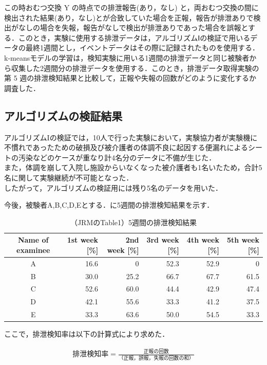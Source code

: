 この時おむつ交換 Y の時点での排泄報告(あり，なし) と，両おむつ交換の間に検出された結果(あり，なし)とが合致していた場合を正報，報告が排泄ありで検出がなしの場合を失報，報告がなしで検出が排泄ありであった場合を誤報とする．このとき，実験に使用する排泄データは，アルゴリズムⅠの検証で用いるデータの最終1週間とし，イベントデータはその際に記録されたものを使用する．k-meansモデルの学習は，検知実験に用いる1週間の排泄データと同じ被験者から収集した2週間分の排泄データを使用する．このとき，排泄データ取得実験の第 5 週の排泄検知結果と比較して，正報や失報の回数がどのように変化するか調査した．

\subsection{アルゴリズムの検証結果}\label{chap:3.3.4}
アルゴリズムIの検証では，10人で行った実験において，実験協力者が実験機に不慣れであったための破損及び被介護者の体調不良に起因する便漏れによるシートの汚染などのケースが重なり計4名分のデータに不備が生じた．\\
また，体調を崩して入院し施設からいなくなった被介護者も1名いたため，合計5名に関して実験継続が不可能となった．\\
したがって，アルゴリズムの検証用には残り5名のデータを用いた．

今後，被験者A,B,C,D,Eとする．に5週間の排泄検知結果を示す．

\begin{table}[t]
\begin{center}
\caption{（JRMのTable1）5週間の排泄検知結果}
\begin{tabular}[t]{c|r|r|r|r|r}
\hline
Name of examinee & 1st week [\%] & 2nd week [\%] & 3rd week [\%] & 4th week [\%] & 5th week [\%] \\ \hline
A & 16.6 & 0 & 52.3 & 52.9 & 0 \\ \hline
B & 30.0 & 25.2 & 66.7 & 67.7 & 61.5 \\ \hline
C & 52.6 & 60.0 & 44.4 & 42.9 & 47.4 \\ \hline
D & 42.1 & 55.6 & 33.3 & 41.2 & 37.5 \\ \hline
E & 33.3 & 63.6 & 50.0 & 54.5 & 33.3 \\ \hline
\end{tabular}
\label{notification1}
\end{center}
\end{table}

ここで，排泄検知率は以下の計算式により求めた．

\begin{eqnarray}
  \mbox{排泄検知率}=\frac{\mbox{正報の回数}}{\mbox{（正報，誤報，失報の回数の和）}} \label{exec}
\end{eqnarray}
\par


